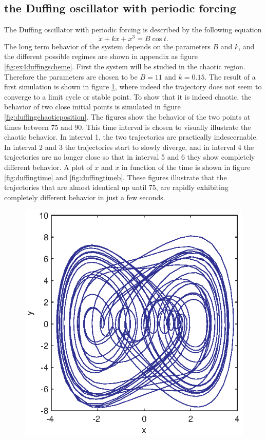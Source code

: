 \subsection{the Duffing oscillator with periodic forcing}
The Duffing oscillator with periodic forcing is described by the following equation 
\begin{equation}
\ddot{x}+k\dot{x}+x^3=B\cos{t}.
\end{equation}
The long term behavior of the system depends on the parameters $B$ and $k$, and the different possible regimes are shown in appendix as figure \ref{fig:ex4duffingscheme}. First the system will be studied in the chaotic region. Therefore the parameters are chosen to be $B=11$ and $k=0.15$. The result of a first simulation is shown in figure \ref{fig:ex4duffingexample}, where indeed the trajectory does not seem to converge to a limit cycle or stable point. To show that it is indeed chaotic, the behavior of two close initial points is simulated in figure \ref{fig:duffingchaoticposition}. The figures show the behavior of the two points at times between 75 and 90. This time interval is chosen to visually illustrate the chaotic behavior. In interval 1, the two trajectories are practically indescernable. In interval 2 and 3 the trajectories start to slowly diverge, and in interval 4 the trajectories are no longer close so that in interval 5 and 6 they show completely different behavior. A plot of $x$ and $\dot{x}$ in function of the time is shown in figure \ref{fig:duffingtime} and \ref{fig:duffingtimeb}. These figures illustrate that the trajectories that are almost identical up until 75, are rapidly exhibiting completely different behavior in just a few seconds.
\begin{figure}[htp]
\centering
\includegraphics{img/ex4/duffingexample.eps}
\caption{}
\label{fig:ex4duffingexample}
\end{figure}
